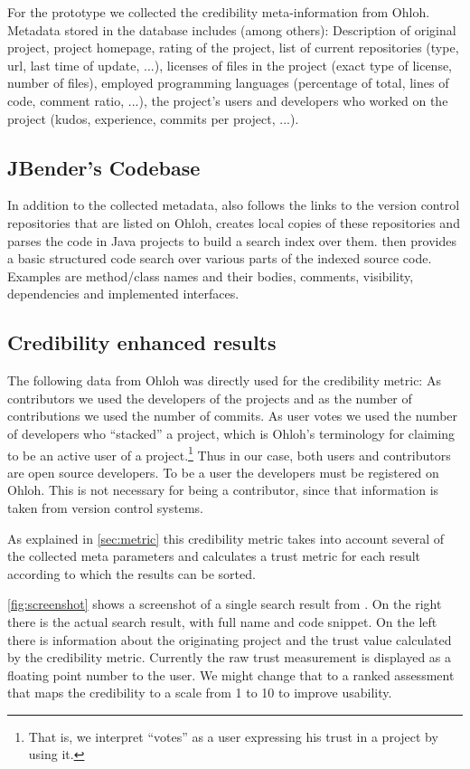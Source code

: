 For the \Jbd prototype we collected the credibility meta-information from Ohloh.
Metadata stored in the database includes (among others): Description of original project, project homepage, rating of the project, list of current repositories (type, url, last time of update, ...), licenses of files in the project (exact type of license, number of files), employed programming languages (percentage of total, lines of code, comment ratio, ...), the project's users and developers who worked on the project (kudos, experience, commits per project, ...).

\subsection{JBender's Codebase}
In addition to the collected metadata, \Jbd also follows the links to the version control repositories that are listed on Ohloh, creates local copies of these repositories and parses the code in Java projects to build a search index over them.
\Jbd then provides a basic structured code search over various parts of the indexed source code. Examples are method/class names and their bodies, comments, visibility, dependencies and implemented interfaces.

\subsection{Credibility enhanced results}

The following data from Ohloh was directly used for the credibility metric: As contributors we used the developers of the projects and as the number of contributions we used the number of commits. As user votes we used the number of developers who ``stacked'' a project, which is Ohloh's terminology for claiming to be an active user of a project.\footnote{That is, we interpret ``votes'' as a user expressing his trust in a project by using it.} Thus in our case, both users and contributors are open source developers. To be a user the developers must be registered on Ohloh.  This is not necessary for being a contributor, since that information is taken from version control systems.

As explained in \autoref{sec:metric} this credibility metric takes into account several of the collected meta parameters and calculates a trust metric for each result according to which the results can be sorted.

\autoref{fig:screenshot} shows a screenshot of a single search result from \Jbd. On the right there is the actual search result, with full name and code snippet. On the left there is information about the originating project and the trust value calculated by the credibility metric. Currently the raw trust measurement is displayed as a floating point number to the user. We might change that to a ranked assessment that maps the credibility to a scale from 1 to 10 to improve usability. 

